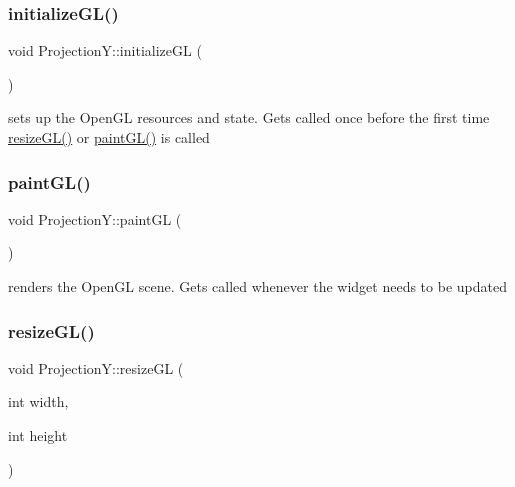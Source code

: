 \subsubsection{\texorpdfstring{initialize\+G\+L()}{initializeGL()}}
{\footnotesize\ttfamily void Projection\+Y\+::initialize\+GL (\begin{DoxyParamCaption}{ }\end{DoxyParamCaption})\hspace{0.3cm}{\ttfamily [protected]}}



sets up the Open\+GL resources and state. Gets called once before the first time \mbox{\hyperlink{class_projection_y_a0e2001d9ee85afa0ce1ad8b2b8f15ad7}{resize\+G\+L()}} or \mbox{\hyperlink{class_projection_y_ad71d2f89a6b30e2979d5cfe2af2a4128}{paint\+G\+L()}} is called 

\mbox{\label{class_projection_y_ad71d2f89a6b30e2979d5cfe2af2a4128}} 
\subsubsection{\texorpdfstring{paint\+G\+L()}{paintGL()}}
{\footnotesize\ttfamily void Projection\+Y\+::paint\+GL (\begin{DoxyParamCaption}{ }\end{DoxyParamCaption})\hspace{0.3cm}{\ttfamily [protected]}}



renders the Open\+GL scene. Gets called whenever the widget needs to be updated 

\mbox{\label{class_projection_y_a0e2001d9ee85afa0ce1ad8b2b8f15ad7}} 
\subsubsection{\texorpdfstring{resize\+G\+L()}{resizeGL()}}
{\footnotesize\ttfamily void Projection\+Y\+::resize\+GL (\begin{DoxyParamCaption}\item[{int}]{width,  }\item[{int}]{height }\end{DoxyParamCaption})\hspace{0.3cm}{\ttfamily [protected]}}




